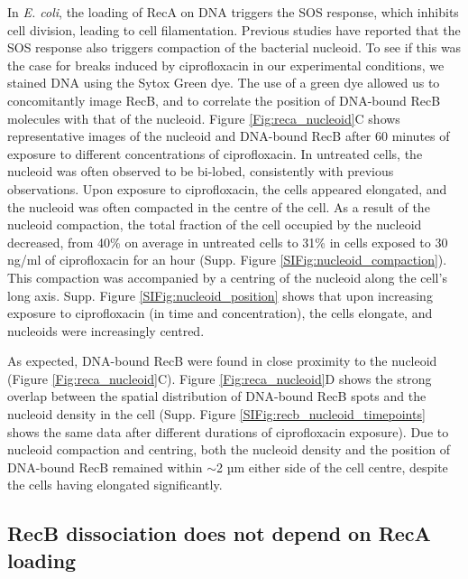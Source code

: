 In \emph{E. coli}, the loading of RecA on DNA triggers the SOS response, which inhibits cell division, leading to cell filamentation. Previous studies have reported that the SOS response also triggers compaction of the bacterial nucleoid.\cite{Odsbu2014} To see if this was the case for breaks induced by ciprofloxacin in our experimental conditions, we stained DNA using the Sytox Green dye. The use of a green dye allowed us to concomitantly image RecB, and to correlate the position of DNA-bound RecB molecules with that of the nucleoid. Figure \ref{Fig:reca_nucleoid}C shows representative images of the nucleoid and DNA-bound RecB after 60 minutes of exposure to different concentrations of ciprofloxacin. In untreated cells, the nucleoid was often observed to be bi-lobed, consistently with previous observations\cite{Lepore2023}. Upon exposure to ciprofloxacin, the cells appeared elongated, and the nucleoid was often compacted in the centre of the cell. As a result of the nucleoid compaction, the total fraction of the cell occupied by the nucleoid decreased, from 40\% on average in untreated cells to 31\% in cells exposed to 30 ng/ml of ciprofloxacin for an hour (Supp. Figure \ref{SIFig:nucleoid_compaction}). This compaction was accompanied by a centring of the nucleoid along the cell's long axis. Supp. Figure \ref{SIFig:nucleoid_position} shows that upon increasing exposure to ciprofloxacin (in time and concentration), the cells elongate, and nucleoids were increasingly centred.

As expected, DNA-bound RecB were found in close proximity to the nucleoid (Figure \ref{Fig:reca_nucleoid}C). Figure \ref{Fig:reca_nucleoid}D shows the strong overlap between the spatial distribution of DNA-bound RecB spots and the nucleoid density in the cell (Supp. Figure \ref{SIFig:recb_nucleoid_timepoints} shows the same data after different durations of ciprofloxacin exposure). Due to nucleoid compaction and centring, both the nucleoid density and the position of DNA-bound RecB remained within $\sim$2 µm either side of the cell centre, despite the cells having elongated significantly.

\subsection*{RecB dissociation does not depend on RecA loading}

